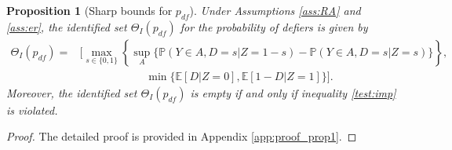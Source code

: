 \documentclass[12pt]{article}
\theoremstyle{plain}
\newtheorem{proposition}{Proposition}%
\theoremstyle{definition}
\theoremstyle{remark}
\begin{document}
\begin{proposition}[Sharp bounds for $p_{df}$]\label{prop_pdf}
Under Assumptions \ref{ass:RA} and \ref{ass:er}, the identified set $\Theta_{I}(p_{df})$ for the probability of defiers is given by
\begin{equation*}
    \begin{aligned}
        \Theta_{I}(p_{df}) = & \bigg[\max _{s \in\{0,1\}}\left\{\sup _A\{\mathbb{P}(Y \in A, D=s  \vert  Z=1-s)-\mathbb{P}(Y \in A, D=s  \vert  Z=s)\}\right\}, \\
        & \qquad \qquad \qquad \min \{\mathbb{E}[D  \vert  Z=0], \mathbb{E}[1-D  \vert  Z=1]\}\bigg].
    \end{aligned}
\end{equation*}
Moreover, the identified set $\Theta_{I}(p_{df})$ is empty if and only if inequality \eqref{test:imp} is violated.

\end{proposition}

\begin{proof}
    The detailed proof is provided in Appendix \ref{app:proof_prop1}.
\end{proof}
\end{document}
